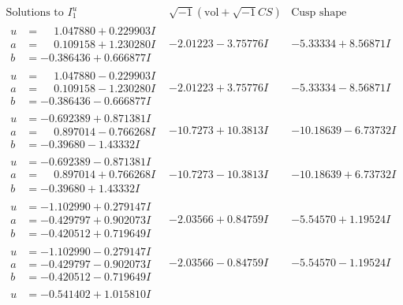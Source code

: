 \documentclass[1p]{elsarticle_modified}
\theoremstyle{definition}
\newcommand{\I}{\sqrt{-1}}
\begin{document}
$$\begin{array}{c|c|c}  
\text{Solutions to }I^u_{1}& \I (\text{vol} + \sqrt{-1}CS) & \text{Cusp shape}\\
 \hline 
\begin{aligned}
u &= \phantom{-}1.047880 + 0.229903 I \\
a &= \phantom{-}0.109158 + 1.230280 I \\
b &= -0.386436 + 0.666877 I\end{aligned}
 & -2.01223 - 3.75776 I & -5.33334 + 8.56871 I \\ \hline\begin{aligned}
u &= \phantom{-}1.047880 - 0.229903 I \\
a &= \phantom{-}0.109158 - 1.230280 I \\
b &= -0.386436 - 0.666877 I\end{aligned}
 & -2.01223 + 3.75776 I & -5.33334 - 8.56871 I \\ \hline\begin{aligned}
u &= -0.692389 + 0.871381 I \\
a &= \phantom{-}0.897014 - 0.766268 I \\
b &= -0.39680 - 1.43332 I\end{aligned}
 & -10.7273 + 10.3813 I & -10.18639 - 6.73732 I \\ \hline\begin{aligned}
u &= -0.692389 - 0.871381 I \\
a &= \phantom{-}0.897014 + 0.766268 I \\
b &= -0.39680 + 1.43332 I\end{aligned}
 & -10.7273 - 10.3813 I & -10.18639 + 6.73732 I \\ \hline\begin{aligned}
u &= -1.102990 + 0.279147 I \\
a &= -0.429797 + 0.902073 I \\
b &= -0.420512 + 0.719649 I\end{aligned}
 & -2.03566 + 0.84759 I & -5.54570 + 1.19524 I \\ \hline\begin{aligned}
u &= -1.102990 - 0.279147 I \\
a &= -0.429797 - 0.902073 I \\
b &= -0.420512 - 0.719649 I\end{aligned}
 & -2.03566 - 0.84759 I & -5.54570 - 1.19524 I \\ \hline\begin{aligned}
u &= -0.541402 + 1.015810 I \\

\end{aligned}
\end{array}$$
\end{document}
